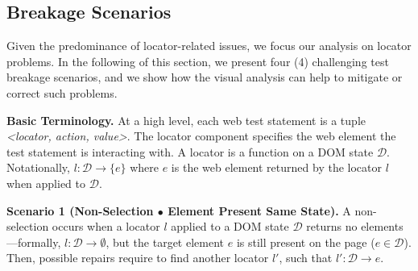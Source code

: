 \subsection{Breakage Scenarios}\label{sec:breakage-scenarios}

Given the predominance of locator-related issues, we focus our analysis on locator problems. In the following of this section, we present four (4) challenging test breakage scenarios, and we show how the visual analysis can help to mitigate or correct such problems. 

\noindent
\textbf{Basic Terminology.}
At a high level, each web test statement is a tuple \textit{<locator, action, value>}. 
The locator component specifies the web element the test statement is interacting with. A locator is a function on a DOM state $\mathcal{D}$. Notationally, $l: \mathcal{D} \rightarrow \{e\}$ where $e$ is the web element returned by the locator $l$ when applied to $\mathcal{D}$. 
%

\noindent
\textbf{Scenario 1 (Non-Selection $\bullet$ Element Present Same State).}
A non-selection occurs when a locator $l$ applied to a DOM state $\mathcal{D}$ returns no elements---formally, $l: \mathcal{D} \rightarrow \emptyset$, but the target element $e$ is still present on the page ($e \in \mathcal{D}$).
Then, possible repairs require to find another locator $l'$, such that $l': \mathcal{D} \rightarrow e$.

